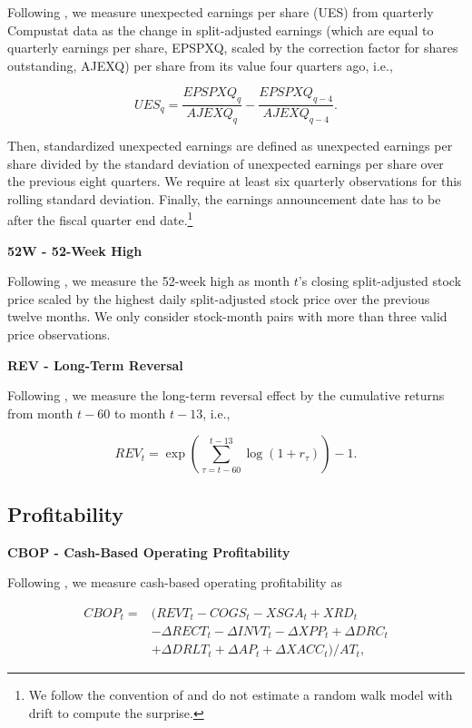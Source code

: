 \documentclass[
  article]{jss}
\begin{document}
Following \citet{foster.1984}, we measure unexpected earnings per share
(UES) from quarterly Compustat data as the change in split-adjusted
earnings (which are equal to quarterly earnings per share, EPSPXQ,
scaled by the correction factor for shares outstanding, AJEXQ) per share
from its value four quarters ago, i.e.,

\[
UES_{q} = \frac{EPSPXQ_{q}}{AJEXQ_{q}} - \frac{EPSPXQ_{q-4}}{AJEXQ_{q-4}}\text{.}
\]

Then, standardized unexpected earnings are defined as unexpected
earnings per share divided by the standard deviation of unexpected
earnings per share over the previous eight quarters. We require at least
six quarterly observations for this rolling standard deviation. Finally,
the earnings announcement date has to be after the fiscal quarter end
date.\footnote{We follow the convention of \citet{hou.2020} and do not
  estimate a random walk model with drift to compute the surprise.}

\textbf{52W - 52-Week High}

Following \citet{george.2004}, we measure the 52-week high as month
\(t\)'s closing split-adjusted stock price scaled by the highest daily
split-adjusted stock price over the previous twelve months. We only
consider stock-month pairs with more than three valid price
observations.

\textbf{REV - Long-Term Reversal}

Following \citet{debondt.1985}, we measure the long-term reversal effect
by the cumulative returns from month \(t-60\) to month \(t-13\), i.e.,

\[
REV_t = \exp\left(\sum^{t-13}_{\tau = t-60}\log(1 + r_{\tau})\right) - 1\text{.}
\]

\subsection{Profitability}\label{profitability}

\textbf{CBOP - Cash-Based Operating Profitability}

Following \citet{ball.2016}, we measure cash-based operating
profitability as

\begin{align*}
CBOP_{t} = &\big(REVT_{t} - COGS_{t} - XSGA_{t} + XRD_{t} \\
&-\Delta RECT_{t} - \Delta INVT_{t} - \Delta XPP_{t} + \Delta DRC_{t} \\
&+ \Delta DRLT_{t} + \Delta AP_{t} + \Delta XACC_{t} \big) / AT_{t}\text{,}
\end{align*}
\end{document}
